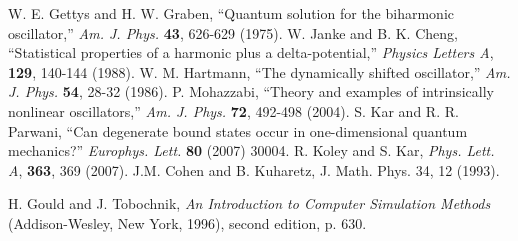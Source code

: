 \documentclass[12pt]{article}
\begin{document}
\begin{thebibliography}{99}
 W. E. Gettys and H. W. Graben, ``Quantum solution for the biharmonic oscillator,'' \textit{Am. J. Phys.} \textbf{43}, 626-629 (1975).
 W. Janke and B. K. Cheng, ``Statistical properties of a harmonic plus a delta-potential,'' \textit{Physics Letters A}, \textbf{129}, 140-144 (1988).
 W. M. Hartmann, ``The dynamically shifted oscillator,'' \textit{Am. J. Phys.} \textbf{54}, 28-32 (1986).
 P. Mohazzabi, ``Theory and examples of intrinsically nonlinear oscillators,'' \textit{Am. J. Phys.} \textbf{72}, 492-498 (2004).
 S. Kar and R. R. Parwani, ``Can degenerate bound states occur in one-dimensional
quantum mechanics?'' \textit{Europhys. Lett.} \textbf{80} (2007) 30004.
 R. Koley and S. Kar, \textit{Phys. Lett. A}, \textbf{363}, 369 (2007).
 J.M. Cohen and B. Kuharetz, J. Math. Phys. 34, 12 (1993).
 




 H. Gould and J. Tobochnik, \textit{An Introduction to Computer Simulation Methods} (Addison-Wesley, New York, 1996), second edition, p. 630.
\end{thebibliography}

\end{document}

